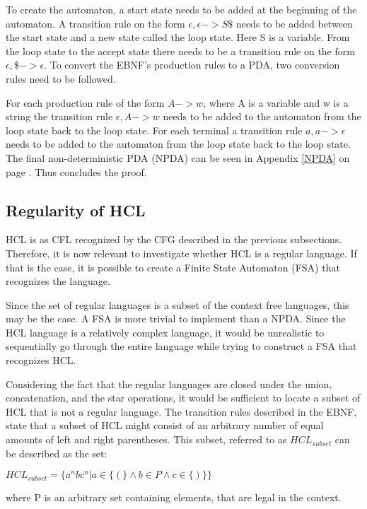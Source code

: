 To create the automaton, a start state needs to be added at the beginning of the automaton. 
A transition rule on the form $\epsilon,\epsilon->S\$$ needs to be added between the start state and a new state called the loop state.
Here S is a variable.
From the loop state to the accept state there needs to be a transition rule on the form $\epsilon,\$->\epsilon$.
To convert the EBNF's production rules to a PDA, two conversion rules need to be followed.

For each production rule of the form $A->w$, where A is a variable and w is a string the transition rule $\epsilon,A->w$ needs to be added to the automaton from the loop state back to the loop state.
For each terminal a transition rule $a,a->\epsilon$ needs to be added to the automaton from the loop state back to the loop state.
The final non-deterministic PDA (NPDA) can be seen in Appendix \ref{NPDA} on page \pageref{NPDA}.
Thus concludes the proof.

\subsection{Regularity of HCL}
HCL is as CFL recognized by the CFG described in the previous subsections.
Therefore, it is now relevant to investigate whether HCL is a regular language. 
If that is the case, it is possible to create a Finite State Automaton (FSA) that recognizes the language.

Since the set of regular languages is a subset of the context free languages, this may be the case.
A FSA is more trivial to implement than a NPDA. 
Since the HCL language is a relatively complex language, it would be unrealistic to sequentially go through the entire language while trying to construct a FSA that recognizes HCL.

Considering the fact that the regular languages are closed under the union, concatenation, and the star operations, it would be sufficient to locate a subset of HCL that is not a regular language.
The transition rules described in the EBNF, state that a subset of HCL might consist of an arbitrary number of equal amounts of left and right parentheses.
This subset, referred to as $HCL_{subset}$ can be described as the set:
\begin{center}
	$HCL_{subset} = \{a^nbc^n | a \in \{(\} \wedge b \in P \wedge c \in \{)\}\}$
\end{center}

where P is an arbitrary set containing elements, that are legal in the context.

